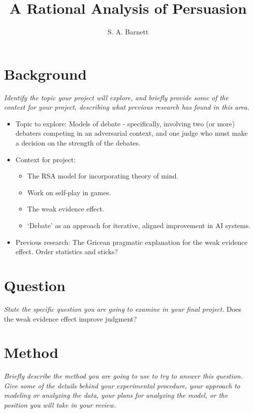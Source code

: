 \documentclass{article}
\title{A Rational Analysis of Persuasion}
\author{S. A. Barnett}
\date{}
\begin{document}
\maketitle

\section{Background}
\textit{Identify the topic your project will explore, and briefly provide some of the context for your project, describing what previous research has found in this area.}

\begin{itemize}
	\item Topic to explore: Models of debate - specifically, involving two (or more) debaters competing in an adversarial context, and one judge who must make a decision on the strength of the debates.
	\item Context for project: 
		\begin{itemize}
			\item The RSA model for incorporating theory of mind.
			\item Work on self-play in games.
			\item The weak evidence effect.
			\item `Debate' as an approach for iterative, aligned improvement in AI systems.
		\end{itemize}	
	\item Previous research: The Gricean pragmatic explanation for the weak evidence effect.	 Order statistics and sticks?
\end{itemize}

\section{Question}
\textit{State the specific question you are going to examine in your final project.}
Does the weak evidence effect improve judgment?

\section{Method}
\textit{Briefly describe the method you are going to use to try to answer this question. Give some of the details behind your experimental procedure, your approach to modeling or analyzing the data, your plans for analyzing the model, or the position you will take in your review.}
\end{document}
